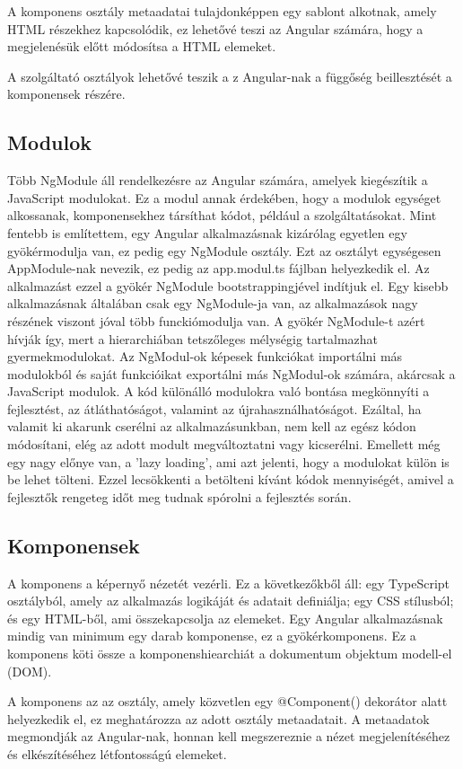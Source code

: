 A komponens osztály metaadatai tulajdonképpen egy sablont alkotnak, amely HTML részekhez kapcsolódik, ez lehetővé teszi az Angular számára, hogy a megjelenésük előtt módosítsa a HTML elemeket.

A szolgáltató osztályok lehetővé teszik a z Angular-nak a függőség beillesztését a komponensek részére.
\subsection{Modulok}
Több NgModule áll rendelkezésre az Angular számára, amelyek kiegészítik a JavaScript modulokat. Ez a modul annak érdekében, hogy a modulok egységet alkossanak, komponensekhez társíthat kódot, például a szolgáltatásokat. Mint fentebb is említettem, egy Angular alkalmazásnak kizárólag egyetlen egy gyökérmodulja van, ez pedig egy NgModule osztály. Ezt az osztályt egységesen AppModule-nak nevezik, ez pedig az app.modul.ts fájlban helyezkedik el. Az alkalmazást ezzel a gyökér NgModule bootstrappingjével indítjuk el. Egy kisebb alkalmazásnak általában csak egy NgModule-ja van, az alkalmazások nagy részének viszont jóval több funckiómodulja van. A gyökér NgModule-t azért hívják így, mert a hierarchiában tetszőleges mélységig tartalmazhat gyermekmodulokat. Az NgModul-ok képesek funkciókat importálni más modulokból és saját funkcióikat exportálni más NgModul-ok számára, akárcsak a JavaScript modulok. A kód különálló modulokra való bontása megkönnyíti a fejlesztést, az átláthatóságot, valamint az újrahasználhatóságot. Ezáltal, ha valamit ki akarunk cserélni az alkalmazásunkban, nem kell az egész kódon módosítani, elég az adott modult megváltoztatni vagy kicserélni. Emellett még egy nagy előnye van, a ’lazy loading’, ami azt jelenti, hogy a modulokat külön is be lehet tölteni. Ezzel lecsökkenti a betölteni kívánt kódok mennyiségét, amivel a fejlesztők rengeteg időt meg tudnak spórolni a fejlesztés során.
\subsection{Komponensek}
A komponens a képernyő nézetét vezérli. Ez a következőkből áll: egy TypeScript osztályból, amely az alkalmazás logikáját és adatait definiálja; egy CSS stílusból; és egy HTML-ből, ami összekapcsolja az elemeket. Egy Angular alkalmazásnak mindig van minimum egy darab komponense, ez a gyökérkomponens. Ez a komponens köti össze a komponenshiearchiát a dokumentum objektum modell-el (DOM).

A komponens az az osztály, amely közvetlen egy @Component() dekorátor alatt helyezkedik el, ez meghatározza az adott osztály metaadatait. A metaadatok megmondják az Angular-nak, honnan kell megszereznie a nézet megjelenítéséhez és elkészítéséhez létfontosságú elemeket.

